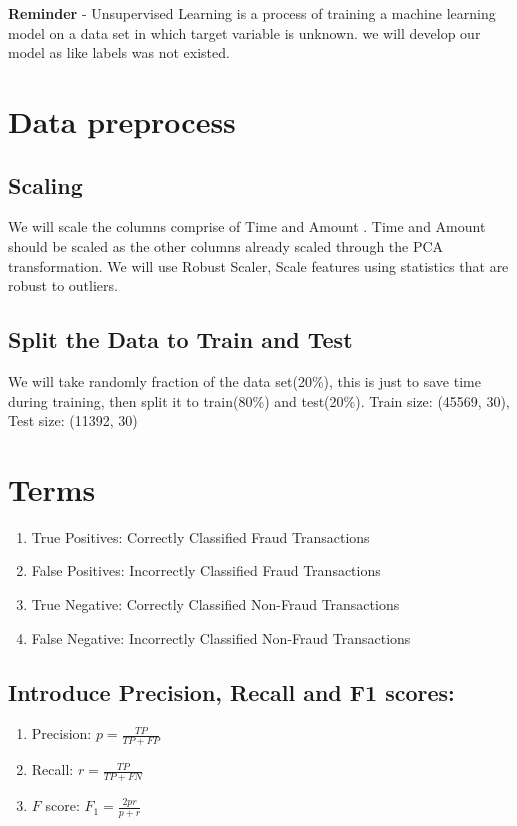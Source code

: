 \documentclass[20pt,a4paper]{article}
\begin{document}
\textbf{Reminder} - Unsupervised Learning is a process of training a
machine learning model on a data set in which target variable is unknown.
we will develop our model as like labels was not existed.

\section{Data preprocess} 
\subsection{Scaling}
We will scale the columns comprise of Time
and Amount . Time and Amount should be scaled as the other columns
already scaled through the PCA transformation. We will use Robust
Scaler, Scale features using statistics that are robust to outliers.

\subsection{Split the Data to Train and Test}
We will take randomly fraction of the data set(20\%), this is just to save time during training, then split it to train(80\%) and test(20\%). 
Train size: (45569, 30), Test size: (11392, 30)
\section{Terms}

\begin{enumerate}[label=\roman*)]
\item
  True Positives: Correctly Classified Fraud Transactions
\item
  False Positives: Incorrectly Classified Fraud Transactions
\item
  True Negative: Correctly Classified Non-Fraud Transactions
\item
  False Negative: Incorrectly Classified Non-Fraud Transactions
\end{enumerate}

\subsection{Introduce Precision, Recall and F1 scores:}

\begin{enumerate}[label=\roman*)]
\item
  Precision: \(p=\frac{TP}{TP + FP}\)
\item
  Recall: \(r=\frac{TP}{TP + FN}\)
\item
 $F$ score: $F_1=\frac{2pr}{p+r}$
\end{enumerate}
\end{document}
